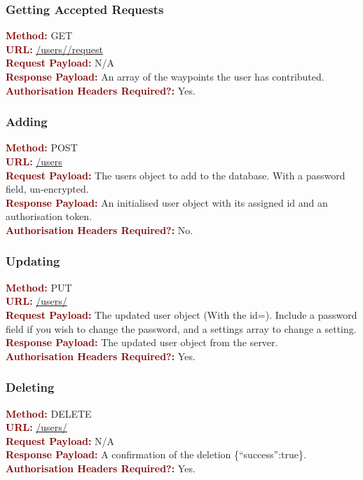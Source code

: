 \documentclass[11pt,a4paper]{report}
\begin{document}
\subsubsection{Getting Accepted Requests}
\textbf{\textcolor{Maroon}{Method:}} GET\\
\textbf{\textcolor{Maroon}{URL:}} \url{/users/}\url{/request}\\
\textbf{\textcolor{Maroon}{Request Payload:}} N/A\\
\textbf{\textcolor{Maroon}{Response Payload:}} An array of the waypoints the user has contributed.\\
\textbf{\textcolor{Maroon}{Authorisation Headers Required?:}} Yes.

\subsubsection{Adding}
\textbf{\textcolor{Maroon}{Method:}} POST\\
\textbf{\textcolor{Maroon}{URL:}} \url{/users}\\
\textbf{\textcolor{Maroon}{Request Payload:}} The users object to add to the database. With a password field, un-encrypted.\\
\textbf{\textcolor{Maroon}{Response Payload:}} An initialised user object with its assigned id and an authorisation token.\\
\textbf{\textcolor{Maroon}{Authorisation Headers Required?:}} No.

\subsubsection{Updating}
\textbf{\textcolor{Maroon}{Method:}} PUT\\
\textbf{\textcolor{Maroon}{URL:}} \url{/users/}\\
\textbf{\textcolor{Maroon}{Request Payload:}} The updated user object (With the id=). Include a password field if you wish to change the password, and a settings array to change a setting.\\
\textbf{\textcolor{Maroon}{Response Payload:}} The updated user object from the server.\\
\textbf{\textcolor{Maroon}{Authorisation Headers Required?:}} Yes.

\subsubsection{Deleting}
\textbf{\textcolor{Maroon}{Method:}} DELETE\\
\textbf{\textcolor{Maroon}{URL:}} \url{/users/}\\
\textbf{\textcolor{Maroon}{Request Payload:}} N/A\\
\textbf{\textcolor{Maroon}{Response Payload:}} A confirmation of the deletion \{``success'':true\}.\\
\textbf{\textcolor{Maroon}{Authorisation Headers Required?:}} Yes.
\end{document}
